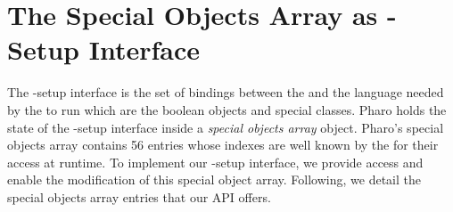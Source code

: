\section{The Special Objects Array as \VM-Setup Interface}\label{sec:setup_interface}

The \VM-setup interface is the set of bindings between the \VM and the language needed by the \VM to run \eg which are the boolean objects and special classes. Pharo \VM holds the state of the \VM-setup interface inside a \emph{special objects array} object. Pharo's special objects array contains 56 entries whose indexes are well known by the \VM for their access at runtime. To implement our \VM-setup interface, we provide access and enable the modification of this special object array. Following, we detail the special objects array entries that our API offers.

